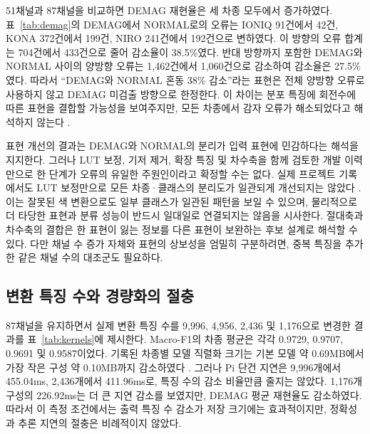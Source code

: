 \documentclass[11pt,a4paper]{article}
\newcommand{\sourceproject}{\citep{project2026}}
\newcommand{\smalltable}[1]{\begingroup\small\setlength{\tabcolsep}{5pt}\endgroup}
\begin{document}
\begin{table}[htbp]
\centering
\caption{최종 87채널 모델 성능. 평균$\pm$표준편차는 3개 폴드의 값이며, DEMAG 재현율은 누적 혼동행렬의 값이다.}
\label{tab:final}
\smalltable{final.tex}
\end{table}

51채널과 87채널을 비교하면 DEMAG 재현율은 세 차종 모두에서 증가하였다.
표~\ref{tab:demag}의 DEMAG에서 NORMAL로의 오류는 IONIQ 91건에서 42건, KONA 372건에서 199건, NIRO 241건에서 192건으로 변하였다.
이 방향의 오류 합계는 704건에서 433건으로 줄어 감소율이 38.5\%였다.
반대 방향까지 포함한 DEMAG와 NORMAL 사이의 양방향 오류는 1,462건에서 1,060건으로 감소하여 감소율은 27.5\%였다.
따라서 ``DEMAG와 NORMAL 혼동 38\% 감소''라는 표현은 전체 양방향 오류로 사용하지 않고 DEMAG 미검출 방향으로 한정한다.
이 차이는 분포 특징에 회전수에 따른 표현을 결합할 가능성을 보여주지만, 모든 차종에서 감자 오류가 해소되었다고 해석하지 않는다 \sourceproject.

\begin{table}[htbp]
\centering
\caption{51채널에서 87채널로의 DEMAG 재현율과 두 방향 오류 변화. $D$는 DEMAG, $N$은 NORMAL이며 pp는 퍼센트포인트이다.}
\label{tab:demag}
\resizebox{\linewidth}{!}{\smalltable{demag.tex}}
\end{table}

표현 개선의 결과는 DEMAG와 NORMAL의 분리가 입력 표현에 민감하다는 해석을 지지한다.
그러나 LUT 보정, 기저 제거, 확장 특징 및 차수축을 함께 검토한 개발 이력만으로 한 단계가 오류의 유일한 주원인이라고 확정할 수는 없다.
실제 프로젝트 기록에서도 LUT 보정만으로 모든 차종·클래스의 분리도가 일관되게 개선되지는 않았다 \sourceproject.
이는 잘못된 색 변환으로도 일부 클래스가 일관된 패턴을 보일 수 있으며, 물리적으로 더 타당한 표현과 분류 성능이 반드시 일대일로 연결되지는 않음을 시사한다.
절대축과 차수축의 결합은 한 표현이 잃는 정보를 다른 표현이 보완하는 후보 설계로 해석할 수 있다.
다만 채널 수 증가 자체와 표현의 상보성을 엄밀히 구분하려면, 중복 특징을 추가한 같은 채널 수의 대조군도 필요하다.

\subsection{변환 특징 수와 경량화의 절충}
87채널을 유지하면서 실제 변환 특징 수를 9,996, 4,956, 2,436 및 1,176으로 변경한 결과를 표~\ref{tab:kernels}에 제시한다.
Macro-F1의 차종 평균은 각각 0.9729, 0.9707, 0.9691 및 0.9587이었다.
기록된 차종별 모델 직렬화 크기는 기본 모델 약 0.69MB에서 가장 작은 구성 약 0.10MB까지 감소하였다 \sourceproject.
그러나 Pi 단건 지연은 9,996개에서 455.04ms, 2,436개에서 411.96ms로, 특징 수의 감소 비율만큼 줄지는 않았다.
1,176개 구성의 226.92ms는 더 큰 지연 감소를 보였지만, DEMAG 평균 재현율도 감소하였다.
따라서 이 측정 조건에서는 출력 특징 수 감소가 저장 크기에는 효과적이지만, 정확성과 추론 지연의 절충은 비례적이지 않았다.
\end{document}
